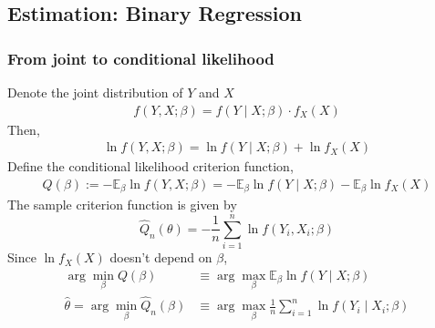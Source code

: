 \documentclass[11pt]{elegantbook}
\begin{document}
\subsection{Estimation: Binary Regression}
\subsubsection*{From joint to conditional likelihood}
Denote the joint distribution of $Y$ and $X$
\begin{equation}
    \begin{aligned}
        f(Y,X;\beta)=f(Y\mid X;\beta)\cdot f_X(X)
    \end{aligned}
    \nonumber
\end{equation}
Then,
\begin{equation}
    \begin{aligned}
        \ln f(Y,X;\beta)=\ln f(Y\mid X;\beta)+\ln f_X(X)
    \end{aligned}
    \nonumber
\end{equation}
Define the conditional likelihood criterion function,
\begin{equation}
    \begin{aligned}
        Q(\beta):=-\mathbb{E}_{\beta}\ln f(Y,X;\beta)=-\mathbb{E}_{\beta}\ln f(Y\mid X;\beta)-\mathbb{E}_{\beta}\ln f_X(X)
    \end{aligned}
    \nonumber
\end{equation}
The sample criterion function is given by $$\hat{Q}_n(\theta)=-\frac{1}{n}\sum_{i=1}^n\ln f(Y_i,X_i;\beta)$$
Since $\ln f_X(X)$ doesn't depend on $\beta$,
\begin{equation}
    \begin{aligned}
        \arg\min_{\beta}Q(\beta)&\equiv \arg\max_{\beta}\mathbb{E}_{\beta}\ln f(Y\mid X;\beta)\\
        \hat{\theta}=\arg\min_{\beta}\hat{Q}_n(\beta)&\equiv \arg\max_{\beta}\frac{1}{n}\sum_{i=1}^n\ln f(Y_i\mid X_i;\beta)
    \end{aligned}
    \nonumber
\end{equation}
\begin{equation}
    \begin{aligned}
    \end{aligned}
    \nonumber
\end{equation}
\end{document}
